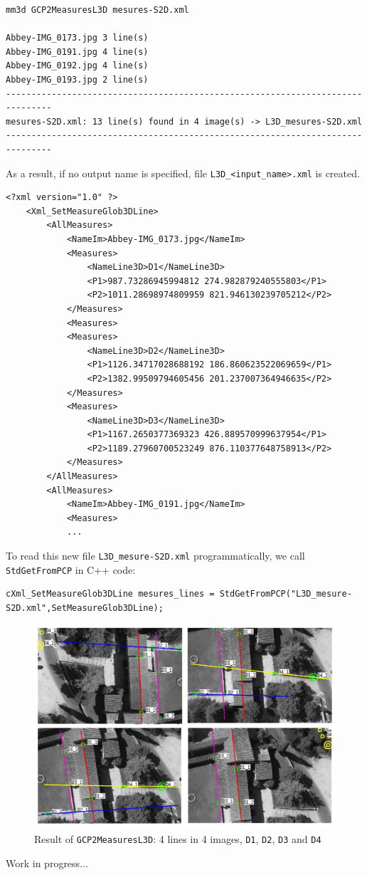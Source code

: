 \begin{verbatim}
mm3d GCP2MeasuresL3D mesures-S2D.xml 

Abbey-IMG_0173.jpg 3 line(s)
Abbey-IMG_0191.jpg 4 line(s)
Abbey-IMG_0192.jpg 4 line(s)
Abbey-IMG_0193.jpg 2 line(s)
-------------------------------------------------------------------------------
mesures-S2D.xml: 13 line(s) found in 4 image(s) -> L3D_mesures-S2D.xml
-------------------------------------------------------------------------------
\end{verbatim}

\noindent As a result, if no output name is specified, file \texttt{L3D\_<input\_name>.xml} is created.\newline

{\scriptsize
\begin{verbatim}
<?xml version="1.0" ?>
    <Xml_SetMeasureGlob3DLine>
        <AllMeasures>
            <NameIm>Abbey-IMG_0173.jpg</NameIm>
            <Measures>
                <NameLine3D>D1</NameLine3D>
                <P1>987.73286945994812 274.982879240555803</P1>
                <P2>1011.28698974809959 821.946130239705212</P2>
            </Measures>
            <Measures>
            <Measures>
                <NameLine3D>D2</NameLine3D>
                <P1>1126.34717028688192 186.860623522069659</P1>
                <P2>1382.99509794605456 201.237007364946635</P2>
            </Measures>
            <Measures>
                <NameLine3D>D3</NameLine3D>
                <P1>1167.2650377369323 426.889570999637954</P1>
                <P2>1189.27960700523249 876.110377648758913</P2>
            </Measures>
        </AllMeasures>
        <AllMeasures>
            <NameIm>Abbey-IMG_0191.jpg</NameIm>
            <Measures>
            ...
\end{verbatim}
}

\noindent To read this new file \texttt{L3D\_mesure-S2D.xml} programmatically, we call \texttt{StdGetFromPCP} in C++ code: \newline


\begin{verbatim}
cXml_SetMeasureGlob3DLine mesures_lines = StdGetFromPCP("L3D_mesure-S2D.xml",SetMeasureGlob3DLine);
\end{verbatim}

\begin{figure}
	\begin{center}
		\includegraphics[width=120mm]{FIGS/Cuxa/linesSaisieAppuisInit2.pdf}
	\end{center}
	\caption{Result of \texttt{GCP2MeasuresL3D}: 4 lines in 4 images, \texttt{D1}, \texttt{D2}, \texttt{D3} and \texttt{D4} }
\end{figure}

\vspace{1cm}
\noindent Work in progress...

